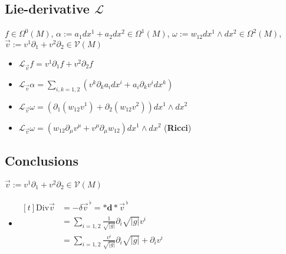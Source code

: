 \documentclass{scrartcl}
\newcommand{\exd}{\mathbf{d}}
\newcommand{\vecflat}[1]{\vec{#1}^{\,\flat}}
\renewcommand{\L}{\mathbf{\mathcal{L}}}
\begin{document}
    \subsection{Lie-derivative \( \L \)}
       \( f\in \Omega^{0}(M)\),
       \( \alpha:= a_{1}dx^{1} + a_{2}dx^{2} \in \Omega^{1}(M) \),
       \( \omega:= w_{12}dx^{1}\wedge dx^{2} \in \Omega^{2}(M) \),
       \( \vec{v} := v^{1}\partial_{1} + v^{2}\partial_{2}\in\mathcal{V}(M) \)
       \begin{itemize}
        \item \( \L_{\vec{v}}f = v^{1}\partial_{1}f + v^{2}\partial_{2}f \)
        \item \( \L_{\vec{v}}\alpha = \sum_{i,k=1,2} \left(v^{k}\partial_{k}a_{i}dx^{i} + a_{i}\partial_{k}v^{i}dx^{k}\right) \)
        \item \( \L_{\vec{v}}\omega = \left( \partial_{1}\left( w_{12}v^{1} \right) 
                                        +  \partial_{2}\left( w_{12}v^{2} \right)\right) dx^{1}\wedge dx^{2}\)
        \item \( \L_{\vec{v}}\omega = \left(w_{12}\partial_{\mu}v^{\mu} + v^{\mu}\partial_{\mu}w_{12}\right) dx^{1}\wedge dx^{2} \)
           (\textbf{Ricci})
       \end{itemize}


    \subsection{Conclusions}
    \(  \vec{v} := v^{1}\partial_{1} + v^{2}\partial_{2}\in\mathcal{V}(M) \)
    \begin{itemize}
      \item \(
        \begin{aligned}[t]
            \text{Div}\vec{v} &= -\delta\vecflat{v} = *\exd * \vecflat{v}&\\
                                 &= \sum_{i=1,2} \frac{1}{\sqrt{|g|}}\partial_{i} \sqrt{|g|} v^{i}&\\
                                 &= \sum_{i=1,2} \frac{v^{i}}{\sqrt{|g|}}\partial_{i} \sqrt{|g|} + \partial_{i}v^{i}
        \end{aligned}\)
    \end{itemize}
        
  
\end{document}
